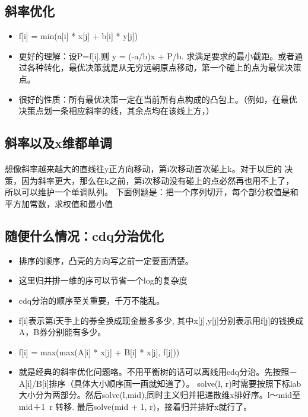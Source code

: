 \documentclass[landscape]{report}
\newcommand{\includecode}[2][c]{}
\begin{document}
\begin{flushleft}
\begin{multicols}{2}
\section{  斜率优化}
\begin{itemize}

\item f[i] = min(a[i] * x[j] + b[i] * y[j])
\item 更好的理解：设P=f[i],则 y = (-a/b)x + P/b. 求满足要求的最小截距。或者通过各种转化，最优决策就是从无穷远朝原点移动，第一个碰上的点为最优决策点。
\item 很好的性质：所有最优决策一定在当前所有点构成的凸包上。（例如，在最优决策点划一条相应斜率的线，其余点均在该线上方，）
\end{itemize} 
\subsection{ 斜率以及x维都单调}
\paragraph{ }
想像斜率越来越大的直线往y正方向移动，第i次移动首次碰上k。对于以后的
    决策，因为斜率更大，那么在k之前，第i次移动没有碰上的点必然再也用不上了，
    所以可以维护一个单调队列。 下面例题是：把一个序列切开，每个部分权值是和平方加常数，求权值和最小值
    
\includecode[c++]{hdu3507.cpp}

\subsection{ 随便什么情况：cdq分治优化}

\begin{itemize}
\item 排序的顺序，凸壳的方向写之前一定要画清楚。
\item 这里归并排一维的序可以节省一个log的复杂度
\item cdq分治的顺序至关重要，千万不能乱。
\item  f[i]表示第i天手上的券全换成现金最多多少, 其中x[j],y[j]分别表示用f[j]的钱换成A，B券分别能有多少。 
\item  f[i] = max(max(A[i] * x[j] + B[i] * x[j], f[j]))
\item 就是经典的斜率优化问题咯。不用平衡树的话可以离线用cdq分治。先按照－A[i]/B[i]排序（具体大小顺序画一画就知道了）。
      solve(l, r)时需要按照下标lab大小分为两部分。然后solve(l,mid),同时主义归并把递散维x排好序。l～mid至mid＋1~r 转移.
      最后solve(mid + 1, r)，接着归并排好x就行了。
\end{itemize}


\end{multicols}
\end{flushleft}
\end{document}
